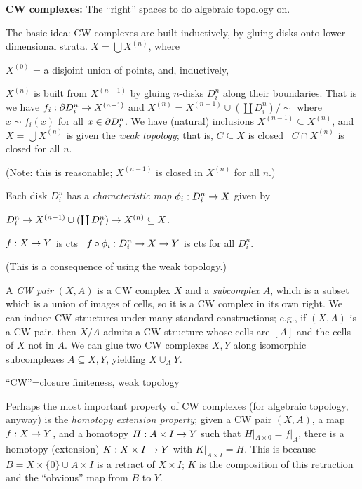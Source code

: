 \bsk

{\bf CW complexes:} The ``right'' spaces to do algebraic topology on.

\msk

The basic idea: CW complexes are built inductively, by gluing 
disks onto lower-dimensional strata. $X=\bigcup X^{(n)}$, where

\ssk

$X^{(0)}$ = a disjoint union of points, and, inductively,

\ssk

$X^{(n)}$ is built from $X^{(n-1)}$ by gluing $n$-disks $D^n_i$
along their boundaries. That is we have $f_i:\partial D^n_i\rightarrow X^{(n-1)}$
and $X^{(n)}=X^{(n-1)}\cup(\coprod D^n_i)/\sim$ where
$x\sim f_i(x)$ for all $x\in\partial D^n_i$. We have (natural)
inclusions $X^{(n-1)}\subseteq X^{(n)}$, and $X=\bigcup X^{(n)}$
is given the {\it weak topology}; that is,  $C\subseteq X$ is closed \lra\
$C\cap X^{(n)}$ is closed for all $n$. 

(Note: this is reasonable;
$X^{(n-1)}$ is closed in $X^{(n)}$ for all $n$.)

\ssk

Each disk $D^n_i$ has a {\it characteristic map} $\phi_i:D^n_i\rightarrow X$
given by 

$D^n_i\rightarrow X^{(n-1)}\cup(\coprod D^n_i)\rightarrow X^{(n)}\subseteq X$.

$f:X\rightarrow Y$ is cts \lra\ $f\circ \phi_i:D^n_i\rightarrow X\rightarrow Y$ is cts for 
all $D^n_i$. 

(This is a consequence of using the weak topology.) 

\msk

A {\it CW pair} $(X,A)$ is a CW complex $X$ and a {\it subcomplex}
$A$, which is a subset which is a union of images of cells, so it is 
a CW complex in its own right. We can induce CW structures under
many standard constructions; e.g., if $(X,A)$ is a CW pair, then
$X/A$ admits a CW structure whose cells are $[A]$ and the cells of 
$X$ not in $A$. We can glue two CW complexes $X,Y$ along isomorphic
subcomplexes $A\subseteq X,Y$, yielding $X\cup_AY$.

\msk

``CW''=closure finiteness, weak topology

\msk

Perhaps the most important property of CW complexes (for algebraic topology,
anyway) is the {\it homotopy extension property}; given a CW pair
$(X,A)$, a map $f:X\rightarrow Y$, and a homotopy $H:A\times I\rightarrow Y$ such that
$H|_{A\times 0}=f|_A$, there is a homotopy (extension)
$K:X\times I\rightarrow Y$ with $K|_{A\times I}=H$. This is because 
$B=X\times\{0\}\cup A\times I$ is a retract of $X\times I$; $K$ is the 
composition of this retraction and the ``obvious'' map from $B$ to $Y$.

